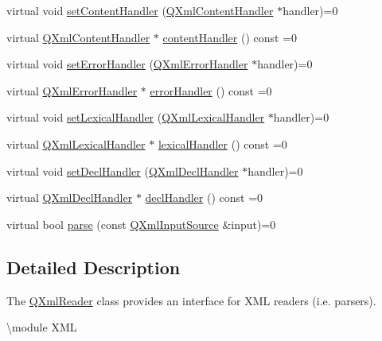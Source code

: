 \begin{DoxyCompactItemize}
virtual void \mbox{\hyperlink{class_q_xml_reader_a767bc5a20ea120ffc2d60f5c42fb28cd}{set\+Content\+Handler}} (\mbox{\hyperlink{class_q_xml_content_handler}{Q\+Xml\+Content\+Handler}} $\ast$handler)=0
\item 
virtual \mbox{\hyperlink{class_q_xml_content_handler}{Q\+Xml\+Content\+Handler}} $\ast$ \mbox{\hyperlink{class_q_xml_reader_ae86bc7841c2dbf289b300a1b00f93187}{content\+Handler}} () const =0
\item 
virtual void \mbox{\hyperlink{class_q_xml_reader_a97cab92522d1ceb8f6da94a161a72ee2}{set\+Error\+Handler}} (\mbox{\hyperlink{class_q_xml_error_handler}{Q\+Xml\+Error\+Handler}} $\ast$handler)=0
\item 
virtual \mbox{\hyperlink{class_q_xml_error_handler}{Q\+Xml\+Error\+Handler}} $\ast$ \mbox{\hyperlink{class_q_xml_reader_aa347587bcc9e8b109aed2c5a41687901}{error\+Handler}} () const =0
\item 
virtual void \mbox{\hyperlink{class_q_xml_reader_ab38c3816bacd14e3efcb8a5e0e5630be}{set\+Lexical\+Handler}} (\mbox{\hyperlink{class_q_xml_lexical_handler}{Q\+Xml\+Lexical\+Handler}} $\ast$handler)=0
\item 
virtual \mbox{\hyperlink{class_q_xml_lexical_handler}{Q\+Xml\+Lexical\+Handler}} $\ast$ \mbox{\hyperlink{class_q_xml_reader_ade3f9c1c3b56110187deab81cd837cd5}{lexical\+Handler}} () const =0
\item 
virtual void \mbox{\hyperlink{class_q_xml_reader_a6d16a9420620f829cacb2cdb256d80a7}{set\+Decl\+Handler}} (\mbox{\hyperlink{class_q_xml_decl_handler}{Q\+Xml\+Decl\+Handler}} $\ast$handler)=0
\item 
virtual \mbox{\hyperlink{class_q_xml_decl_handler}{Q\+Xml\+Decl\+Handler}} $\ast$ \mbox{\hyperlink{class_q_xml_reader_a635ea0540ef702ccd0db0a15958d3fea}{decl\+Handler}} () const =0
\item 
virtual bool \mbox{\hyperlink{class_q_xml_reader_a5f7ba5edeea40d6042c63beab50866b2}{parse}} (const \mbox{\hyperlink{class_q_xml_input_source}{Q\+Xml\+Input\+Source}} \&input)=0
\end{DoxyCompactItemize}


\subsection{Detailed Description}
The \mbox{\hyperlink{class_q_xml_reader}{Q\+Xml\+Reader}} class provides an interface for X\+ML readers (i.\+e. parsers). 

\textbackslash{}module X\+ML

